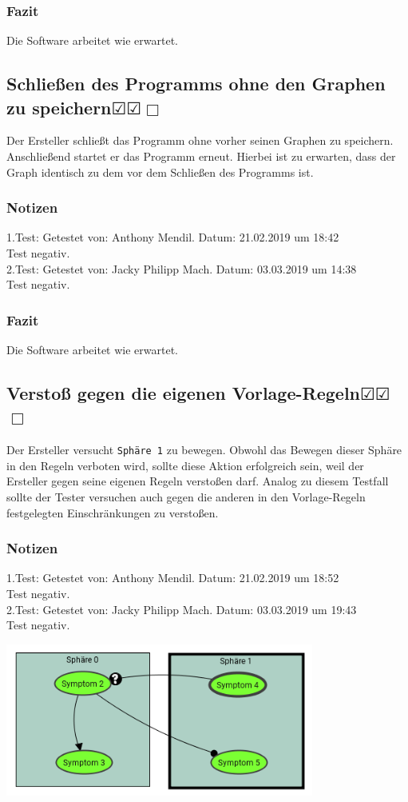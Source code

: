 \documentclass[enabledeprecatedfontcommands]{scrartcl}
\newcommand{\subsectiont}[2]{\subsection[#1]{#1{\normalsize\normalfont #2}}}
\newcommand{\leer}{$\Box$}
\newcommand{\ok}{$\CheckedBox$}
\begin{document}
\subsubsection{Fazit}
Die Software arbeitet wie erwartet.

\subsectiont{Schließen des Programms ohne den Graphen zu speichern}{\dotfill\ok\ok\leer}
Der Ersteller schließt das Programm ohne vorher seinen Graphen zu speichern. Anschließend startet er das Programm erneut. Hierbei ist zu erwarten, dass der Graph identisch zu dem vor dem Schließen des Programms ist. 
\subsubsection{Notizen}
1.Test: Getestet von: Anthony Mendil. Datum: 21.02.2019 um 18:42 \\
Test negativ.\\
2.Test: Getestet von: Jacky Philipp Mach. Datum: 03.03.2019 um 14:38 \\
Test negativ.
\subsubsection{Fazit}
Die Software arbeitet wie erwartet. 

\subsectiont{Verstoß gegen die eigenen Vorlage-Regeln}{\dotfill\ok\ok\leer}
Der Ersteller versucht \texttt{Sphäre 1} zu bewegen. Obwohl das Bewegen dieser Sphäre in den Regeln verboten wird, sollte diese Aktion erfolgreich sein, weil der Ersteller gegen seine eigenen Regeln verstoßen darf. Analog zu diesem Testfall sollte der Tester versuchen auch gegen die anderen in den Vorlage-Regeln festgelegten Einschränkungen zu verstoßen. 
\subsubsection{Notizen}
1.Test: Getestet von: Anthony Mendil. Datum: 21.02.2019 um 18:52 \\
Test negativ. \\
2.Test: Getestet von: Jacky Philipp Mach. Datum: 03.03.2019 um 19:43 \\
Test negativ.
\begin{center}
\includegraphics[height=5cm]{1_11.PNG}
\end{center}
\end{document}
